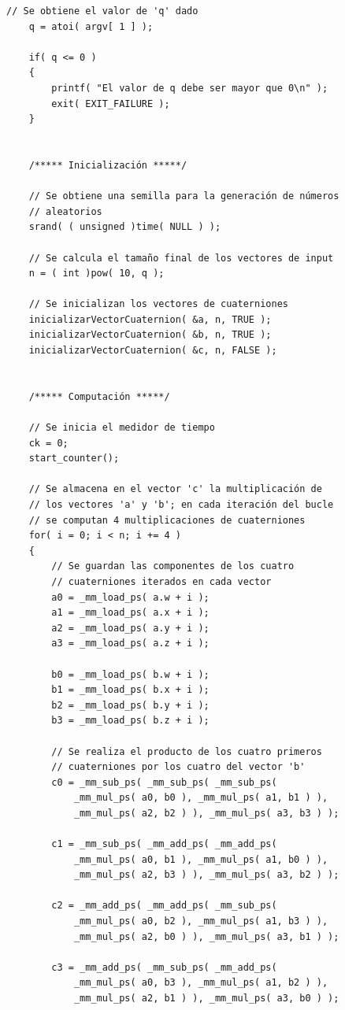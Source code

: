 \documentclass[conference]{IEEEtran}
\begin{document}
\begin{lstlisting}[style=CStyle, title=Código con la ejecución del bucle vectorizada.]
    // Se obtiene el valor de 'q' dado
    q = atoi( argv[ 1 ] );

    if( q <= 0 )
    {
        printf( "El valor de q debe ser mayor que 0\n" );
        exit( EXIT_FAILURE );
    }


    /***** Inicialización *****/

    // Se obtiene una semilla para la generación de números
    // aleatorios
    srand( ( unsigned )time( NULL ) );

    // Se calcula el tamaño final de los vectores de input
    n = ( int )pow( 10, q );

    // Se inicializan los vectores de cuaterniones
    inicializarVectorCuaternion( &a, n, TRUE );
    inicializarVectorCuaternion( &b, n, TRUE );
    inicializarVectorCuaternion( &c, n, FALSE );


    /***** Computación *****/

    // Se inicia el medidor de tiempo
    ck = 0;
    start_counter();

    // Se almacena en el vector 'c' la multiplicación de
    // los vectores 'a' y 'b'; en cada iteración del bucle
    // se computan 4 multiplicaciones de cuaterniones
    for( i = 0; i < n; i += 4 )
    {
        // Se guardan las componentes de los cuatro
        // cuaterniones iterados en cada vector
        a0 = _mm_load_ps( a.w + i );
        a1 = _mm_load_ps( a.x + i );
        a2 = _mm_load_ps( a.y + i );
        a3 = _mm_load_ps( a.z + i );

        b0 = _mm_load_ps( b.w + i );
        b1 = _mm_load_ps( b.x + i );
        b2 = _mm_load_ps( b.y + i );
        b3 = _mm_load_ps( b.z + i );

        // Se realiza el producto de los cuatro primeros
        // cuaterniones por los cuatro del vector 'b'
        c0 = _mm_sub_ps( _mm_sub_ps( _mm_sub_ps(
            _mm_mul_ps( a0, b0 ), _mm_mul_ps( a1, b1 ) ),
            _mm_mul_ps( a2, b2 ) ), _mm_mul_ps( a3, b3 ) );
            
        c1 = _mm_sub_ps( _mm_add_ps( _mm_add_ps(
            _mm_mul_ps( a0, b1 ), _mm_mul_ps( a1, b0 ) ),
            _mm_mul_ps( a2, b3 ) ), _mm_mul_ps( a3, b2 ) );
            
        c2 = _mm_add_ps( _mm_add_ps( _mm_sub_ps(
            _mm_mul_ps( a0, b2 ), _mm_mul_ps( a1, b3 ) ),
            _mm_mul_ps( a2, b0 ) ), _mm_mul_ps( a3, b1 ) );
            
        c3 = _mm_add_ps( _mm_sub_ps( _mm_add_ps(
            _mm_mul_ps( a0, b3 ), _mm_mul_ps( a1, b2 ) ),
            _mm_mul_ps( a2, b1 ) ), _mm_mul_ps( a3, b0 ) );


\end{lstlisting}
\end{document}
